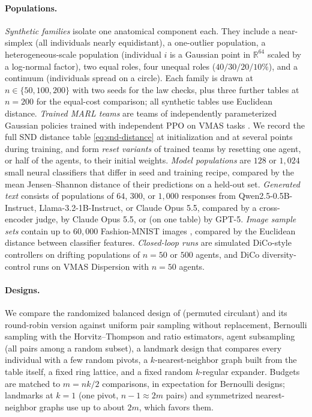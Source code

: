 \documentclass[twoside,11pt]{article}
\newcommand{\R}{\mathbb{R}}
\begin{document}
\paragraph{Populations.}
\emph{Synthetic families} isolate one anatomical component each. They
include a near-simplex (all individuals nearly equidistant), a one-outlier
population, a heterogeneous-scale population (individual $i$ is a Gaussian
point in $\R^{64}$ scaled by a log-normal factor), two equal roles, four
unequal roles ($40/30/20/10\%$), and a continuum (individuals spread on a
circle). Each family is drawn at $n\in\{50,100,200\}$ with two seeds for
the law checks, plus three further tables at $n=200$ for the equal-cost
comparison; all synthetic tables use Euclidean distance. \emph{Trained MARL teams} are teams of independently
parameterized Gaussian policies trained with independent PPO on VMAS
tasks \citep{bettini2022vmas}. We record the full SND distance table
\eqref{eq:snd-distance} at initialization and at several points during
training, and form \emph{reset variants} of trained teams by resetting one
agent, or half of the agents, to their initial weights. \emph{Model populations} are $128$ or $1{,}024$ small neural
classifiers that differ in seed and training recipe, compared by the mean
Jensen--Shannon distance of their predictions on a held-out set.
\emph{Generated text} consists of populations of $64$, $300$, or $1{,}000$
responses from \mbox{Qwen2.5-0.5B-Instruct}, \mbox{Llama-3.2-1B-Instruct}, or Claude
Opus 5.5, compared by a cross-encoder judge, by Claude Opus 5.5, or (on one
table) by GPT-5. \emph{Image sample sets} contain up to $60{,}000$
Fashion-MNIST images \citep{xiao2017fashion}, compared by the Euclidean distance between classifier
features. \emph{Closed-loop runs} are simulated DiCo-style controllers on
drifting populations of $n=50$ or $500$ agents, and DiCo diversity-control
runs on VMAS Dispersion with $n=50$ agents.

\paragraph{Designs.}
We compare the randomized balanced design of 
(permuted circulant) and its round-robin version against uniform pair
sampling without replacement, Bernoulli sampling with the
Horvitz--Thompson and ratio estimators, agent subsampling (all pairs among
a random subset), a landmark design that compares every individual with a
few random pivots, a $k$-nearest-neighbor graph built from the table
itself, a fixed ring lattice, and a fixed random $k$-regular
expander. Budgets are matched to $m=nk/2$ comparisons, in expectation for
Bernoulli designs; landmarks at $k=1$ (one pivot, $n-1\approx 2m$ pairs) and symmetrized
nearest-neighbor graphs use up to about $2m$, which favors them.
\end{document}
